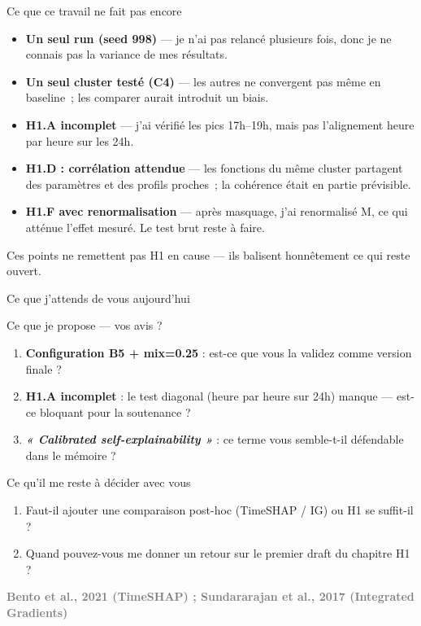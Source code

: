 \documentclass[10pt]{beamer}
\newcommand{\source}[1]{\vspace{4pt}\hfill{\textcolor{gray}{\textbf{\tiny #1}}}}
\begin{document}
\begin{frame}{Ce que ce travail ne fait pas encore}
  \footnotesize
  \begin{itemize}\setlength{\itemsep}{3pt}
    \item \textbf{Un seul run (seed 998)} --- je n'ai pas relancé plusieurs fois, donc je ne connais pas la variance de mes résultats.
    \item \textbf{Un seul cluster testé (C4)} --- les autres ne convergent pas même en baseline~; les comparer aurait introduit un biais.
    \item \textbf{H1.A incomplet} --- j'ai vérifié les pics 17h--19h, mais pas l'alignement heure par heure sur les 24h.
    \item \textbf{H1.D : corrélation attendue} --- les fonctions du même cluster partagent des paramètres et des profils proches~; la cohérence était en partie prévisible.
    \item \textbf{H1.F avec renormalisation} --- après masquage, j'ai renormalisé M, ce qui atténue l'effet mesuré. Le test brut reste à faire.
  \end{itemize}

  \begin{interpbox}
    \footnotesize
    Ces points ne remettent pas H1 en cause --- ils balisent honnêtement ce qui reste ouvert.
  \end{interpbox}
\end{frame}

\begin{frame}{Ce que j'attends de vous aujourd'hui}
  \begin{block}{Ce que je propose — vos avis ?}
    \footnotesize
    \begin{enumerate}\setlength{\itemsep}{2pt}
      \item \textbf{Configuration B5 + mix=0.25} : est-ce que vous la validez comme version finale ?
      \item \textbf{H1.A incomplet} : le test diagonal (heure par heure sur 24h) manque --- est-ce bloquant pour la soutenance ?
      \item \textbf{\emph{« Calibrated self-explainability »}} : ce terme vous semble-t-il défendable dans le mémoire ?
    \end{enumerate}
  \end{block}

  \begin{exampleblock}{Ce qu'il me reste à décider avec vous}
    \footnotesize
    \begin{enumerate}\setlength{\itemsep}{2pt}
      \item Faut-il ajouter une comparaison post-hoc (TimeSHAP / IG) ou H1 se suffit-il ?
      \item Quand pouvez-vous me donner un retour sur le premier draft du chapitre H1 ?
    \end{enumerate}
  \end{exampleblock}

  \source{Bento et al., 2021 (TimeSHAP) ; Sundararajan et al., 2017 (Integrated Gradients)}
\end{frame}
\end{document}
